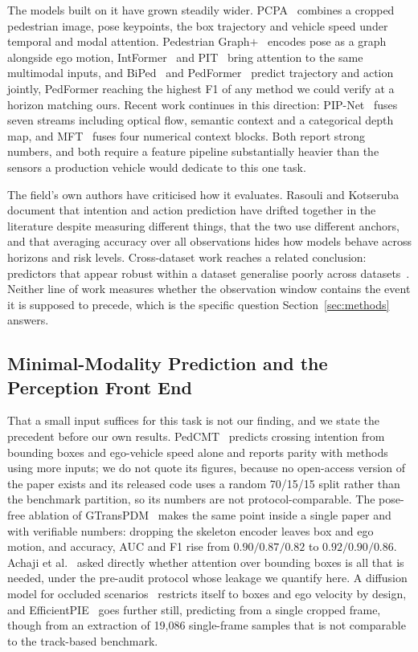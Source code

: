 \documentclass[mti,article,submit,moreauthors]{Definitions/mdpi}
\begin{document}
The models built on it have grown steadily wider. PCPA~\citep{kotseruba2021benchmark} combines a cropped pedestrian image, pose keypoints, the box trajectory and vehicle speed under temporal and modal attention. Pedestrian Graph$+$~\citep{cadena2022pedgraph} encodes pose as a graph alongside ego motion, IntFormer~\citep{lorenzo2021intformer} and PIT~\citep{zhou2023pit} bring attention to the same multimodal inputs, and BiPed~\citep{rasouli2021biped} and PedFormer~\citep{rasouli2023pedformer} predict trajectory and action jointly, PedFormer reaching the highest F1 of any method we could verify at a horizon matching ours. Recent work continues in this direction: PIP-Net~\citep{azarmi2025pipnet} fuses seven streams including optical flow, semantic context and a categorical depth map, and MFT~\citep{li2025mft} fuses four numerical context blocks. Both report strong numbers, and both require a feature pipeline substantially heavier than the sensors a production vehicle would dedicate to this one task.

The field's own authors have criticised how it evaluates. Rasouli and Kotseruba~\citep{rasouli2024diving} document that intention and action prediction have drifted together in the literature despite measuring different things, that the two use different anchors, and that averaging accuracy over all observations hides how models behave across horizons and risk levels. Cross-dataset work reaches a related conclusion: predictors that appear robust within a dataset generalise poorly across datasets~\citep{gesnouin2022assessing}. Neither line of work measures whether the observation window contains the event it is supposed to precede, which is the specific question Section~\ref{sec:methods} answers.

\subsection{Minimal-Modality Prediction and the Perception Front End}

That a small input suffices for this task is not our finding, and we state the precedent before our own results. PedCMT~\citep{chen2024pedcmt} predicts crossing intention from bounding boxes and ego-vehicle speed alone and reports parity with methods using more inputs; we do not quote its figures, because no open-access version of the paper exists and its released code uses a random 70/15/15 split rather than the benchmark partition, so its numbers are not protocol-comparable. The pose-free ablation of GTransPDM~\citep{xie2025gtranspdm} makes the same point inside a single paper and with verifiable numbers: dropping the skeleton encoder leaves box and ego motion, and accuracy, AUC and F1 rise from $0.90 / 0.87 / 0.82$ to $0.92 / 0.90 / 0.86$. Achaji et al.~\citep{achaji2022attention} asked directly whether attention over bounding boxes is all that is needed, under the pre-audit protocol whose leakage we quantify here. A diffusion model for occluded scenarios~\citep{liu2025occlusion} restricts itself to boxes and ego velocity by design, and EfficientPIE~\citep{qu2025efficientpie} goes further still, predicting from a single cropped frame, though from an extraction of 19,086 single-frame samples that is not comparable to the track-based benchmark.
\end{document}
